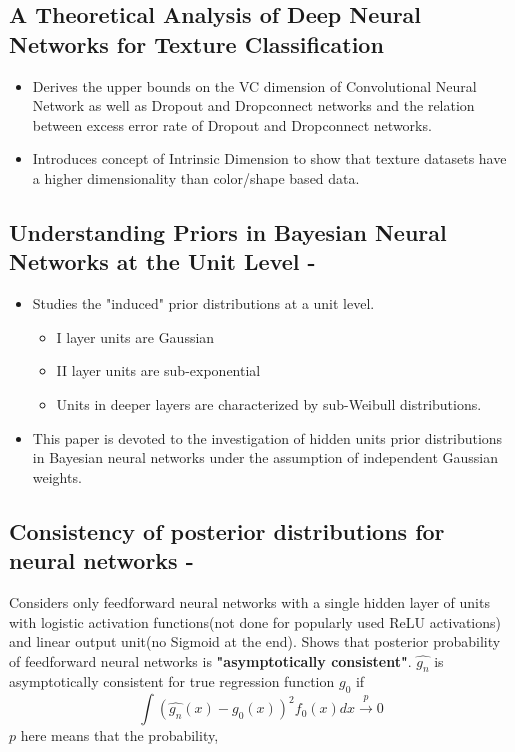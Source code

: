 \documentclass[a4paper,twocolumn]{article}
\begin{document}
\subsection{A Theoretical Analysis of Deep Neural Networks for Texture Classification \cite{VC-CNN}}
\label{sec-3-4}
\begin{itemize}
\item Derives the upper bounds on the VC dimension of Convolutional Neural Network as well as Dropout and Dropconnect networks and the relation between excess error rate of Dropout and Dropconnect networks.

\item Introduces concept  of Intrinsic  Dimension to  show  that  texture  datasets  have  a higher dimensionality than color/shape based data.
\end{itemize}

\subsection{Understanding Priors in Bayesian Neural Networks at the Unit Level - \cite{vladimirova2019understanding}}
\label{sec-3-5}
\begin{itemize}
\item Studies the "induced" prior distributions at a unit level. 
\begin{itemize}
\item I layer units are Gaussian
\item II layer units are sub-exponential
\item Units in deeper layers are characterized by sub-Weibull distributions.
\end{itemize}
\item This paper is devoted to the investigation of hidden units prior distributions in Bayesian neural networks under the assumption of independent Gaussian weights.
\end{itemize}

\subsection{Consistency of posterior distributions for neural networks - \cite{lee2000consistency}}
\label{sec-3-6}

Considers only feedforward neural networks with a single hidden layer of units with logistic activation functions(not done for popularly used ReLU activations) and linear output unit(no Sigmoid at the end).
Shows that posterior probability of feedforward neural networks is \textbf{"asymptotically consistent"}. \( \hat{g_n} \) is asymptotically consistent for true regression function \( g_0 \) if
\begin{equation}
    \int (\hat{g_n}(x) - g_0(x))^2f_0(x)dx \xrightarrow{p} 0
\end{equation}
\( p \) here means that the probability, 
\end{document}
